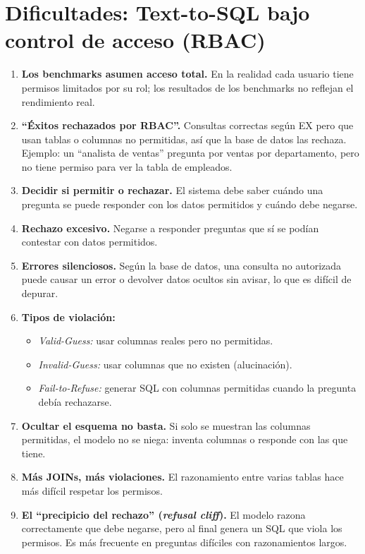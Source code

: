 \documentclass[11pt,a4paper]{article}
\begin{document}
\section{Dificultades: Text-to-SQL bajo control de acceso (RBAC)}
\begin{enumerate}
  \item \textbf{Los benchmarks asumen acceso total.} En la realidad cada usuario tiene permisos limitados por su rol; los resultados de los benchmarks no reflejan el rendimiento real.
  \item \textbf{``Éxitos rechazados por RBAC''.} Consultas correctas según EX pero que usan tablas o columnas no permitidas, así que la base de datos las rechaza. Ejemplo: un ``analista de ventas'' pregunta por ventas por departamento, pero no tiene permiso para ver la tabla de empleados.
  \item \textbf{Decidir si permitir o rechazar.} El sistema debe saber cuándo una pregunta se puede responder con los datos permitidos y cuándo debe negarse.
  \item \textbf{Rechazo excesivo.} Negarse a responder preguntas que sí se podían contestar con datos permitidos.
  \item \textbf{Errores silenciosos.} Según la base de datos, una consulta no autorizada puede causar un error o devolver datos ocultos sin avisar, lo que es difícil de depurar.
  \item \textbf{Tipos de violación:}
  \begin{itemize}
    \item \textit{Valid-Guess:} usar columnas reales pero no permitidas.
    \item \textit{Invalid-Guess:} usar columnas que no existen (alucinación).
    \item \textit{Fail-to-Refuse:} generar SQL con columnas permitidas cuando la pregunta debía rechazarse.
  \end{itemize}
  \item \textbf{Ocultar el esquema no basta.} Si solo se muestran las columnas permitidas, el modelo no se niega: inventa columnas o responde con las que tiene.
  \item \textbf{Más JOINs, más violaciones.} El razonamiento entre varias tablas hace más difícil respetar los permisos.
  \item \textbf{El ``precipicio del rechazo'' (\textit{refusal cliff}).} El modelo razona correctamente que debe negarse, pero al final genera un SQL que viola los permisos. Es más frecuente en preguntas difíciles con razonamientos largos.

\end{enumerate}
\end{document}
